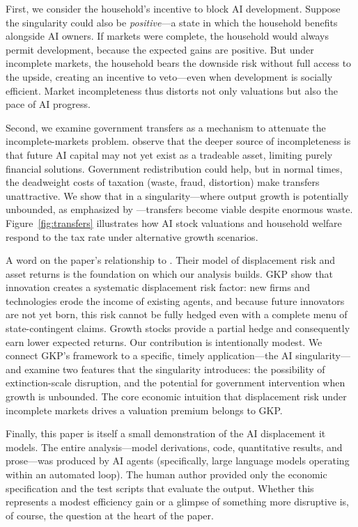 \documentclass[12pt]{article}
\begin{document}
First, we consider the household's incentive to block AI development. Suppose the singularity could also be \emph{positive}---a state in which the household benefits alongside AI owners. If markets were complete, the household would always permit development, because the expected gains are positive. But under incomplete markets, the household bears the downside risk without full access to the upside, creating an incentive to veto---even when development is socially efficient. Market incompleteness thus distorts not only valuations but also the pace of AI progress.

Second, we examine government transfers as a mechanism to attenuate the incomplete-markets problem. \citet{GKP2012} observe that the deeper source of incompleteness is that future AI capital may not yet exist as a tradeable asset, limiting purely financial solutions. Government redistribution could help, but in normal times, the deadweight costs of taxation (waste, fraud, distortion) make transfers unattractive. We show that in a singularity---where output growth is potentially unbounded, as emphasized by \citet{Jones2024}---transfers become viable despite enormous waste. Figure~\ref{fig:transfers} illustrates how AI stock valuations and household welfare respond to the tax rate under alternative growth scenarios.

A word on the paper's relationship to \citet{GKP2012}. Their model of displacement risk and asset returns is the foundation on which our analysis builds. GKP show that innovation creates a systematic displacement risk factor: new firms and technologies erode the income of existing agents, and because future innovators are not yet born, this risk cannot be fully hedged even with a complete menu of state-contingent claims. Growth stocks provide a partial hedge and consequently earn lower expected returns. Our contribution is intentionally modest. We connect GKP's framework to a specific, timely application---the AI singularity---and examine two features that the singularity introduces: the possibility of extinction-scale disruption, and the potential for government intervention when growth is unbounded. The core economic intuition that displacement risk under incomplete markets drives a valuation premium belongs to GKP.

Finally, this paper is itself a small demonstration of the AI displacement it models. The entire analysis---model derivations, code, quantitative results, and prose---was produced by AI agents (specifically, large language models operating within an automated loop). The human author provided only the economic specification and the test scripts that evaluate the output. Whether this represents a modest efficiency gain or a glimpse of something more disruptive is, of course, the question at the heart of the paper.
\end{document}
